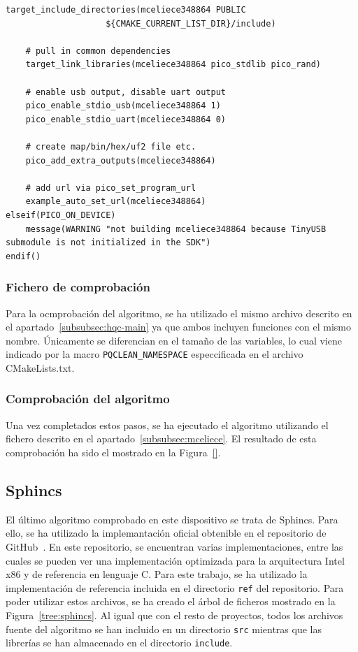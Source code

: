 \begin{lstlisting}[label={lst:mceliece-make},style=Cnice,firstnumber=1,caption={Archivo \texttt{McEliece348864/CMakeLists.txt}.}]
    target_include_directories(mceliece348864 PUBLIC
                    ${CMAKE_CURRENT_LIST_DIR}/include)

    # pull in common dependencies
    target_link_libraries(mceliece348864 pico_stdlib pico_rand)

    # enable usb output, disable uart output
    pico_enable_stdio_usb(mceliece348864 1)
    pico_enable_stdio_uart(mceliece348864 0)

    # create map/bin/hex/uf2 file etc.
    pico_add_extra_outputs(mceliece348864)

    # add url via pico_set_program_url
    example_auto_set_url(mceliece348864)
elseif(PICO_ON_DEVICE)
    message(WARNING "not building mceliece348864 because TinyUSB submodule is not initialized in the SDK")
endif()
\end{lstlisting}


\subsubsection{Fichero de comprobación}\label{subsubsec:mceliece-main}

Para la ocmprobación del algoritmo, se ha utilizado el mismo archivo descrito en el apartado~\ref{subsubsec:hqc-main} ya que ambos incluyen funciones con el mismo nombre.
Únicamente se diferencian en el tamaño de las variables, lo cual viene indicado por la macro \texttt{PQCLEAN\_NAMESPACE} especcificada en el archivo CMakeLists.txt.


\subsubsection{Comprobación del algoritmo}\label{subsubsec:mceliece-comp}

Una vez completados estos pasos, se ha ejecutado el algoritmo utilizando el fichero descrito en el apartado~\ref{subsubsec:mceliece}.
El resultado de esta comprobación ha sido el mostrado en la Figura~\ref{}.



\subsection{Sphincs}\label{subsec:sphincs}

El último algoritmo comprobado en este dispositivo se trata de Sphincs.
Para ello, se ha utilizado la implemantación oficial obtenible en el repositorio de GitHub~\cite{sphincs-github}.
En este repositorio, se encuentran varias implementaciones, entre las cuales se pueden ver una implementación optimizada para la arquitectura Intel x86 y de referencia en lenguaje C.
Para este trabajo, se ha utilizado la implementación de referencia incluida en el directorio \texttt{ref} del repositorio.
Para poder utilizar estos archivos, se ha creado el árbol de ficheros mostrado en la Figura~\ref{tree:sphincs}.
Al igual que con el resto de proyectos, todos los archivos fuente del algoritmo se han incluido en un directorio \texttt{src} mientras que las librerías se han  almacenado en el directorio \texttt{include}.

